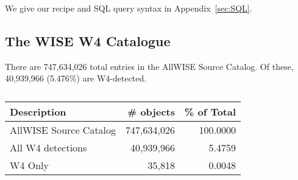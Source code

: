\documentclass[usenatbib]{mnras}
\begin{document}
We give our recipe and SQL query syntax in Appendix~\ref{sec:SQL}.


\subsection{The WISE W4 Catalogue}
There are 747,634,026 total entries in the AllWISE Source Catalog.  Of
these, 40,939,966 (5.476\%) are W4-detected.

\begin{table}
  \begin{center}
    \begin{tabular}{l rr}
      \hline
      \hline
      Description & \#  objects & \% of Total \\         
      \hline  
      AllWISE Source Catalog & 747,634,026  & 100.0000 \\
      All W4 detections          &  40,939,966  &      5.4759 \\
      W4 Only                        &         35,818  &      0.0048\\
     \hline
      \hline
    \end{tabular}
    \caption{}
    \label{tab:ERQ_key_numbers}
  \end{center}
  \vspace{-8pt}
\end{table}





    
\end{document}

